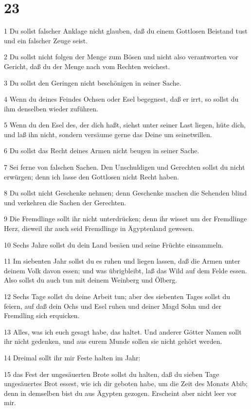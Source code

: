 \chapter{23}

\par 1 Du sollst falscher Anklage nicht glauben, daß du einem Gottlosen Beistand tust und ein falscher Zeuge seist.
\par 2 Du sollst nicht folgen der Menge zum Bösen und nicht also verantworten vor Gericht, daß du der Menge nach vom Rechten weichest.
\par 3 Du sollst den Geringen nicht beschönigen in seiner Sache.
\par 4 Wenn du deines Feindes Ochsen oder Esel begegnest, daß er irrt, so sollst du ihm denselben wieder zuführen.
\par 5 Wenn du den Esel des, der dich haßt, siehst unter seiner Last liegen, hüte dich, und laß ihn nicht, sondern versäume gerne das Deine um seinetwillen.
\par 6 Du sollst das Recht deines Armen nicht beugen in seiner Sache.
\par 7 Sei ferne von falschen Sachen. Den Unschuldigen und Gerechten sollst du nicht erwürgen; denn ich lasse den Gottlosen nicht Recht haben.
\par 8 Du sollst nicht Geschenke nehmen; denn Geschenke machen die Sehenden blind und verkehren die Sachen der Gerechten.
\par 9 Die Fremdlinge sollt ihr nicht unterdrücken; denn ihr wisset um der Fremdlinge Herz, dieweil ihr auch seid Fremdlinge in Ägyptenland gewesen.
\par 10 Sechs Jahre sollst du dein Land besäen und seine Früchte einsammeln.
\par 11 Im siebenten Jahr sollst du es ruhen und liegen lassen, daß die Armen unter deinem Volk davon essen; und was übrigbleibt, laß das Wild auf dem Felde essen. Also sollst du auch tun mit deinem Weinberg und Ölberg.
\par 12 Sechs Tage sollst du deine Arbeit tun; aber des siebenten Tages sollst du feiern, auf daß dein Ochs und Esel ruhen und deiner Magd Sohn und der Fremdling sich erquicken.
\par 13 Alles, was ich euch gesagt habe, das haltet. Und anderer Götter Namen sollt ihr nicht gedenken, und aus eurem Munde sollen sie nicht gehört werden.
\par 14 Dreimal sollt ihr mir Feste halten im Jahr:
\par 15 das Fest der ungesäuerten Brote sollst du halten, daß du sieben Tage ungesäuertes Brot essest, wie ich dir geboten habe, um die Zeit des Monats Abib; denn in demselben bist du aus Ägypten gezogen. Erscheint aber nicht leer vor mir.
